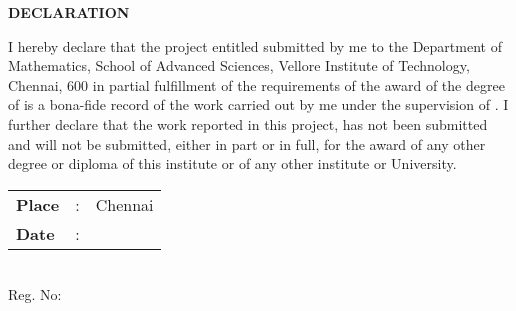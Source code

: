 \thispagestyle{plain}

\begin{center}
{\Large \bf DECLARATION}\\[0.75cm]
\end{center}


I hereby declare that the project entitled 
{\bf \printtitle} 
submitted by me to the Department of Mathematics, School of Advanced Sciences, Vellore Institute of Technology, Chennai, 600 
in partial fulfillment of the requirements of the award of the degree of {\bf \theprogrammeLongName} 
is a bona-fide record of the work  
carried out by me under the supervision of {\bf \theguide}. 
I further declare that 
the work reported in this project, has not been submitted and will not be submitted,
either in part or in full, for the award of any other degree or diploma of this
institute or of any other institute or University.

%

%
%

\vspace{3\baselineskip}

\begin{minipage}{.5\textwidth}
	\raggedright
	\begin{tabular}{lcl}
		\textbf{Place}  & : & Chennai \\
		\textbf{Date} & : &
	\end{tabular}
\end{minipage}%
\begin{minipage}{.5\textwidth}
	\raggedleft
	\thestudent\\
	Reg. No: \theregno\\
\end{minipage}

\cleardoublepage


%
%  



